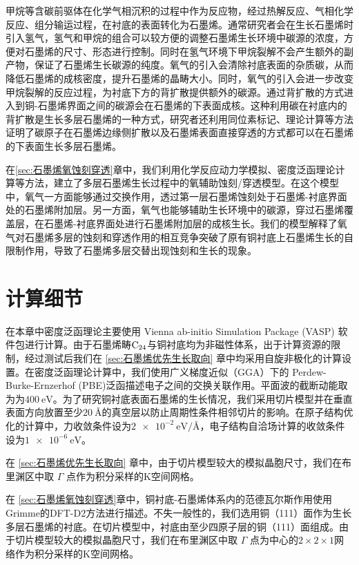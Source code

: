 甲烷等含碳前驱体在化学气相沉积的过程中作为反应物，经过热解反应、气相化学反应、组分输运过程，在衬底的表面转化为石墨烯。通常研究者会在生长石墨烯时引入氢气，氢气和甲烷的组合可以较方便的调整石墨烯生长环境中碳源的浓度，方便对石墨烯的尺寸、形态进行控制。同时在氢气环境下甲烷裂解不会产生额外的副产物，保证了石墨烯生长碳源的纯度。氧气的引入会清除衬底表面的杂质碳，从而降低石墨烯的成核密度，提升石墨烯的晶畴大小。同时，氧气的引入会进一步改变甲烷裂解的反应过程，为衬底下方的背扩散提供额外的碳源。通过背扩散的方式进入到铜-石墨烯界面之间的碳源会在石墨烯的下表面成核。这种利用碳在衬底内的背扩散是生长多层石墨烯的一种方式，研究者还利用同位素标记、理论计算等方法证明了碳原子在石墨烯边缘侧扩散以及石墨烯表面直接穿透的方式都可以在石墨烯的下表面生长多层石墨烯。

在\ref{sec:石墨烯氧蚀刻穿透}章中，我们利用化学反应动力学模拟、密度泛函理论计算等方法，建立了多层石墨烯生长过程中的氧辅助蚀刻/穿透模型。在这个模型中，氧气一方面能够通过交换作用，透过第一层石墨烯蚀刻处于石墨烯-衬底界面处的石墨烯附加层。另一方面，氧气也能够辅助生长环境中的碳源，穿过石墨烯覆盖层，在石墨烯-衬底界面处进行石墨烯附加层的成核生长。我们的模型解释了氧气对石墨烯多层的蚀刻和穿透作用的相互竞争突破了原有铜衬底上石墨烯生长的自限制作用，导致了石墨烯多层交替出现蚀刻和生长的现象。

\section{计算细节}
在本章中密度泛函理论主要使用 Vienna ab-initio Simulation Package (VASP) 软件包进行计算。由于石墨烯畴$\rm{C_{24}}$与铜衬底均为非磁性体系，出于计算资源的限制，经过测试后我们在 \ref{sec:石墨烯优先生长取向} 章中均采用自旋非极化的计算设置。在密度泛函理论计算中，我们使用广义梯度近似（GGA）下的 Perdew-Burke-Ernzerhof (PBE)泛函描述电子之间的交换关联作用。平面波的截断动能取为为$\SI{400}{\electronvolt}$。为了研究铜衬底表面石墨烯的生长情况，我们采用切片模型并在垂直表面方向放置至少$\SI{20}{\angstrom}$的真空层以防止周期性条件相邻切片的影响。在原子结构优化的计算中，力收敛条件设为$\SI{2e-2}{\electronvolt \per \angstrom}$，电子结构自洽场计算的收敛条件设为$\SI{1e-6}{\electronvolt}$。

在 \ref{sec:石墨烯优先生长取向} 章中，由于切片模型较大的模拟晶胞尺寸，我们在布里渊区中取 $\Gamma$ 点作为积分采样的K空间网格。

在 \ref{sec:石墨烯氧蚀刻穿透}章中，铜衬底-石墨烯体系内的范德瓦尔斯作用使用Grimme的DFT-D2方法进行描述。不失一般性的，我们选用铜（111）面作为生长多层石墨烯的衬底。在切片模型中，衬底由至少四原子层的铜（111）面组成。由于切片模型较大的模拟晶胞尺寸，我们在布里渊区中取 $\Gamma$ 点为中心的$2\times 2\times 1$网络作为积分采样的K空间网格。

